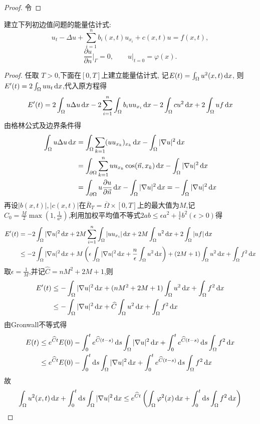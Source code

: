 \begin{proof}
  令
\end{proof}


\begin{exercise}
  建立下列初边值问题的能量估计式:
  \[u_t - \Delta u + \sum_{i=1}^n b_i(x,t) u_{x_i} + c(x,t)u = f(x,t),\]
  \[\frac{\partial u}{\partial n}\bigg|_{\varGamma} = 0,
    \qquad u|_{t=0} = \varphi(x).\]
\end{exercise}

\begin{proof}
  任取 $T>0$,下面在$[0,T]$上建立能量估计式, 记$E(t)=\int_{\Omega}u^2(x,t)\mathop{}\!\mathrm{d} x$,
  则$E'(t)=2\int_{\Omega}uu_t\mathop{}\!\mathrm{d} x$,代入原方程得
  \[E'(t)=2\int_{\Omega}u\Delta u\mathop{}\!\mathrm{d} x-2\sum_{i=1}^n\int_{\Omega}b_iuu_{x_i}\mathop{}\!\mathrm{d} x-2\int_{\Omega}cu^2\mathop{}\!\mathrm{d} x+2\int_{\Omega}uf\mathop{}\!\mathrm{d} x\]
  由格林公式及边界条件得
  \[\begin{split}
  \int_{\Omega}u\Delta u\diff x&=\int_{\Omega}\sum_{k=1}(uu_{x_k})_{x_k}\diff x-\int_{\Omega}|\nabla u|^2\diff x\\
  &=\int_{\partial\Omega}\sum_{k=1}^nuu_{x_k}\cos(\vec{n},x_k)\diff x-\int_{\Omega}|\nabla u|^2\diff x\\
  &=\int_{\partial\Omega}u\frac{\partial u}{\partial\vec{n}}\diff x-\int_{\Omega}|\nabla u|^2\diff x=-\int_{\Omega}|\nabla u|^2\diff x
  \end{split}\]
  再设$|b(x,t)|,|c(x,t)|$在$\overline{R}_T=\overline{\Omega}\times[0,T]$上的最大值为$M$,记$C_0=\frac{M}{2}\max(1,\frac{1}{a^2})$,利用加权平均值不等式$2ab\leq\epsilon a^2+\frac{1}{\epsilon}b^2(\epsilon>0)$得
  \[\begin{split}
  E'(t)&=-2\int_{\Omega}|\nabla u|^2\diff x+2M\sum_{i=1}^n\int_{\Omega}|uu_{x_i}|\diff x+2M\int_{\Omega}u^2\diff x+2\int_{\Omega}|uf|\diff x\\
  &\leq-2\int_{\Omega}|\nabla u|^2\diff x+M\left(\epsilon\int_{\Omega}|\nabla u|^2\diff x+\frac{n}{\epsilon}\int_{\Omega}u^2\diff x\right)+(2M+1)\int_{\Omega}u^2\diff x+\int_{\Omega}f^2\diff x
  \end{split}\]
  取$\epsilon=\frac{1}{M}$,并记$\widehat{C}=nM^2+2M+1$,则
  \[\begin{split}
  E'(t)&\leq-\int_{\Omega}|\nabla u|^2\mathop{}\!\mathrm{d} x+(nM^2+2M+1)\int_{\Omega}u^2\mathop{}\!\mathrm{d} x+\int_{\Omega}f^2\mathop{}\!\mathrm{d} x\\
  &\leq-\int_{\Omega}|\nabla u|^2\mathop{}\!\mathrm{d} x+\widehat{C}\int_{\Omega}u^2\mathop{}\!\mathrm{d} x+\int_{\Omega}f^2\mathop{}\!\mathrm{d} x
  \end{split}\]
  由Gronwall不等式得
  \[\begin{split}
  E(t)&\leq e^{\widehat{C}t}E(0)-\int_0^te^{\widehat{C}(t-s)}\diff s\int_{\Omega}|\nabla u|^2\diff x+\int_0^te^{\widehat{C}(t-s)}\diff s\int_{\Omega}f^2\diff x\\
  &\leq e^{\widehat{C}t}E(0)-\int_0^t\diff s\int_{\Omega}|\nabla u|^2\diff x+\int_0^te^{\widehat{C}(t-s)}\diff s\int_{\Omega}f^2\diff x
  \end{split}\]
  故
  \[\int_{\Omega}u^2(x,t)\mathop{}\!\mathrm{d} x+\int_0^t\mathop{}\!\mathrm{d} s\int_{\Omega}|\nabla u|^2\mathop{}\!\mathrm{d} x\leq e^{\widehat{C}t}\left(\int_{\Omega}\varphi^2(x)\mathop{}\!\mathrm{d} x+\int_0^t\mathop{}\!\mathrm{d} s\int_{\Omega}f^2\mathop{}\!\mathrm{d} x\right)\]
\end{proof}


